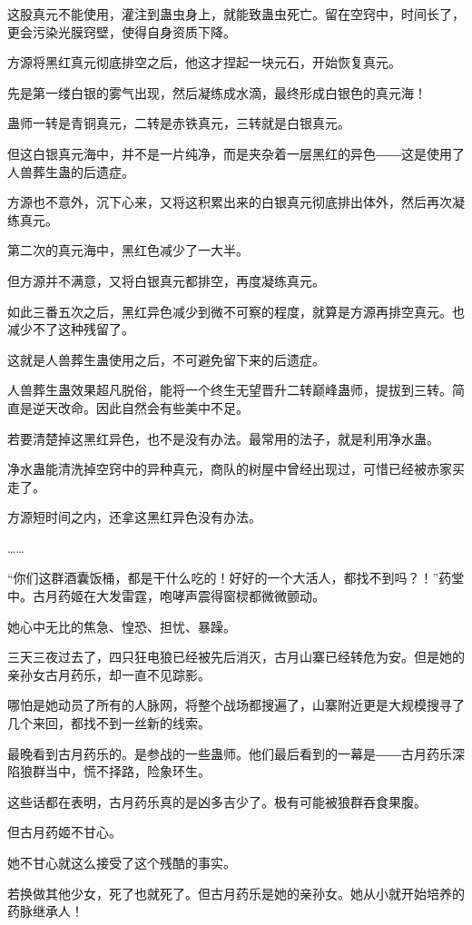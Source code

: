\begin{this_body}
这股真元不能使用，灌注到蛊虫身上，就能致蛊虫死亡。留在空窍中，时间长了，更会污染光膜窍壁，使得自身资质下降。

方源将黑红真元彻底排空之后，他这才捏起一块元石，开始恢复真元。

先是第一缕白银的雾气出现，然后凝练成水滴，最终形成白银色的真元海！

蛊师一转是青铜真元，二转是赤铁真元，三转就是白银真元。

但这白银真元海中，并不是一片纯净，而是夹杂着一层黑红的异色――这是使用了人兽葬生蛊的后遗症。

方源也不意外，沉下心来，又将这积累出来的白银真元彻底排出体外，然后再次凝练真元。

第二次的真元海中，黑红色减少了一大半。

但方源并不满意，又将白银真元都排空，再度凝练真元。

如此三番五次之后，黑红异色减少到微不可察的程度，就算是方源再排空真元。也减少不了这种残留了。

这就是人兽葬生蛊使用之后，不可避免留下来的后遗症。

人兽葬生蛊效果超凡脱俗，能将一个终生无望晋升二转巅峰蛊师，提拔到三转。简直是逆天改命。因此自然会有些美中不足。

若要清楚掉这黑红异色，也不是没有办法。最常用的法子，就是利用净水蛊。

净水蛊能清洗掉空窍中的异种真元，商队的树屋中曾经出现过，可惜已经被赤家买走了。

方源短时间之内，还拿这黑红异色没有办法。

……

“你们这群酒囊饭桶，都是干什么吃的！好好的一个大活人，都找不到吗？！”药堂中。古月药姬在大发雷霆，咆哮声震得窗棂都微微颤动。

她心中无比的焦急、惶恐、担忧、暴躁。

三天三夜过去了，四只狂电狼已经被先后消灭，古月山寨已经转危为安。但是她的亲孙女古月药乐，却一直不见踪影。

哪怕是她动员了所有的人脉网，将整个战场都搜遍了，山寨附近更是大规模搜寻了几个来回，都找不到一丝新的线索。

最晚看到古月药乐的。是参战的一些蛊师。他们最后看到的一幕是――古月药乐深陷狼群当中，慌不择路，险象环生。

这些话都在表明，古月药乐真的是凶多吉少了。极有可能被狼群吞食果腹。

但古月药姬不甘心。

她不甘心就这么接受了这个残酷的事实。

若换做其他少女，死了也就死了。但古月药乐是她的亲孙女。她从小就开始培养的药脉继承人！


\end{this_body}
